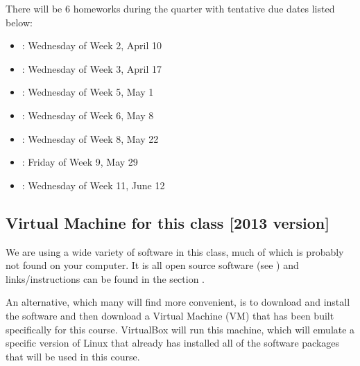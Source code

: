 \documentclass[letterpaper,10pt,english]{sphinxmanual}
\begin{document}
There will be 6 homeworks during the quarter with
tentative due dates listed below:
\begin{itemize}
\item {} 
: Wednesday of Week 2, April 10

\item {} 
: Wednesday of Week 3, April 17

\item {} 
: Wednesday of Week 5, May 1

\item {} 
: Wednesday of Week 6, May 8

\item {} 
: Wednesday of Week 8, May 22

\item {} 
: Friday of Week 9, May 29

\item {} 
: Wednesday of Week 11, June 12

\end{itemize}


\subsection{Virtual Machine for this class {[}2013 version{]}}
\label{2013/vm::doc}\label{2013/vm:vm}\label{2013/vm:virtual-machine-for-this-class-2013-version}
We are using a wide variety of software in this class, much of which is
probably not found on your computer.  It is all open source software (see
) and links/instructions
can be found in the section {\hyperref[software_installation:software\string-installation]{}}.

An alternative, which many will find more convenient, is to download and
install the \label{2013/vm:id1}{\hyperref[biblio:virtualbox]{\crossref{{[}VirtualBox{]}}}} software and then download a Virtual Machine (VM)
that has been built specifically for this course.  VirtualBox will run this
machine, which will emulate a specific version of Linux that already has
installed all of the software packages that will be used in this course.
\end{document}
